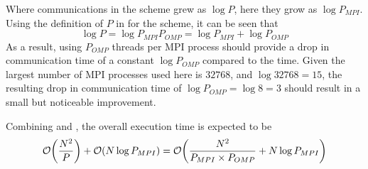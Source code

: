 Where communications in the \replicateddata{} scheme grew as $\log{P}$,
here they grow as $\log{P_{MPI}}$.
%
Using the definition of $P$ in  for the
\sharedandreplicateddata{} scheme, it can be seen that
\begin{equation}
    \log{P} = \log{P_{MPI}P_{OMP}} = \log{P_{MPI}} + \log{P_{OMP}}
\end{equation}
%
As a result, using $P_{OMP}$ threads per MPI process should provide
a drop in communication time of a constant $\log{P_{OMP}}$ compared
to the \replicateddata{} time.
%
Given the largest number of MPI processes used here is $32768$,
and $\log{32768} = 15$, the resulting drop in communication
time of $\log{P_{OMP}} = \log{8} = 3$ should result in a small
but noticeable improvement.


%
Combining
 and
,
the overall execution time is expected to be
\begin{equation}
    \label{eqn:shared_and_replicated_data_overall_time}
    \mathcal{O}{\left({ \frac{N^2}{P} }\right)} + \mathcal{O}{\left({ N\log{P_{MPI}} }\right)}
        = \mathcal{O}{\left({ \frac{N^2}{P_{MPI} \times{} P_{OMP}} + N\log{P_{MPI}} }\right)}
\end{equation}


%
%
\begin{figure}[!h]
    
    \caption{}
    \label{fig:v1_shared_and_replicated_pair_operation_512_logtime}
\end  {figure}

\begin{figure}[!h]
    
    \caption{}
    \label{fig:v1_shared_and_replicated_pair_operation_4096_logtime}
\end  {figure}

\begin{figure}[!h]
    
    \caption{}
    \label{fig:v1_shared_and_replicated_pair_operation_32768_logtime}
\end  {figure}

